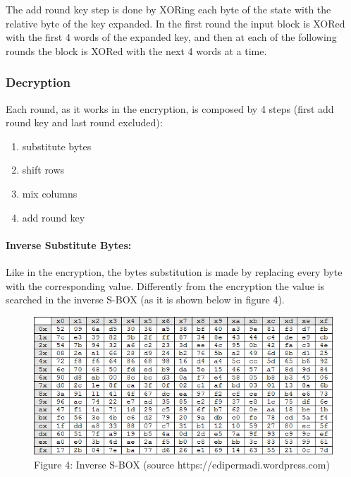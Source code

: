 The add round key step is done by XORing each byte of the state with the relative byte of the key expanded. In the first round the input block is XORed with the first 4 words of the expanded key, and then at each of the following rounds the block is XORed with the next 4 words at a time.

\subsubsection{Decryption}
Each round, as it works in the encryption, is composed by 4 steps (first add round key and last round excluded):
\begin{enumerate}
\item substitute bytes
\item shift rows
\item mix columns
\item add round key
\end{enumerate}
\paragraph{Inverse Substitute Bytes: }
Like in the encryption, the bytes substitution is made by replacing every byte with the corresponding value. Differently from the encryption the value is searched in the inverse S-BOX (as it is shown below in figure 4).

\begin{figure}[htbp]
\centering
\includegraphics[scale=0.7]{isbox.png}
\\Figure 4: Inverse S-BOX (source https://edipermadi.wordpress.com)
\end{figure}

